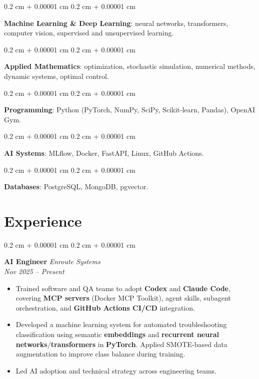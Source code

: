 \documentclass[10pt, letterpaper]{article}
\newenvironment{highlights}{
    \begin{itemize}[
        topsep=0.10 cm,
        parsep=0.10 cm,
        partopsep=0pt,
        itemsep=0pt,
        leftmargin=0.4 cm + 10pt
    ]
}{
    \end{itemize}
}
\newenvironment{onecolentry}{
    \begin{adjustwidth}{
        0.2 cm + 0.00001 cm
    }{
        0.2 cm + 0.00001 cm
    }
}{
    \end{adjustwidth}
}
\begin{document}
\vspace{0.05 cm}

\begin{onecolentry}
\textbf{Machine Learning \& Deep Learning}: neural networks, transformers, computer vision, supervised and unsupervised learning.
\end{onecolentry}

\vspace{0.05 cm}

\begin{onecolentry}
\textbf{Applied Mathematics}: optimization, stochastic simulation, numerical methods, dynamic systems, optimal control.
\end{onecolentry}

\vspace{0.05 cm}

\begin{onecolentry}
\textbf{Programming}: Python (PyTorch, NumPy, SciPy, Scikit-learn, Pandas), OpenAI Gym.
\end{onecolentry}

\vspace{0.05 cm}

\begin{onecolentry}
\textbf{AI Systems}: MLflow, Docker, FastAPI, Linux, GitHub Actions.
\end{onecolentry}

\vspace{0.05 cm}

\begin{onecolentry}
\textbf{Databases}: PostgreSQL, MongoDB, pgvector.
\end{onecolentry}

\section{Experience}
\begin{onecolentry}
\textbf{AI Engineer} \hfill \textit{Enroute Systems} \\
\textit{Nov 2025 -- Present}
\begin{highlights}
    \item Trained software and QA teams to adopt \textbf{Codex} and \textbf{Claude Code}, covering \textbf{MCP servers} (Docker MCP Toolkit), agent skills, subagent orchestration, and \textbf{GitHub Actions CI/CD} integration.
    \item Developed a machine learning system for automated troubleshooting classification using semantic \textbf{embeddings} and \textbf{recurrent neural networks}/\textbf{transformers} in \textbf{PyTorch}. Applied SMOTE-based data augmentation to improve class balance during training.
    \item Led AI adoption and technical strategy across engineering teams.
\end{highlights}
\end{onecolentry}
\end{document}
